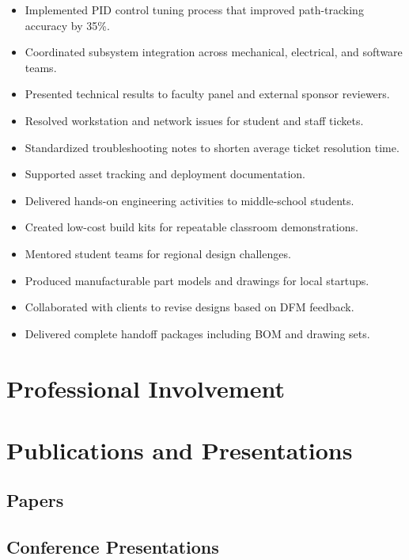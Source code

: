 \documentclass{engresume}
\begin{document}
\begin{itemize}
    \item Implemented PID control tuning process that improved path-tracking accuracy by 35\%.
    \item Coordinated subsystem integration across mechanical, electrical, and software teams.
    \item Presented technical results to faculty panel and external sponsor reviewers.
\end{itemize}

\begin{itemize}
    \item Resolved workstation and network issues for student and staff tickets.
    \item Standardized troubleshooting notes to shorten average ticket resolution time.
    \item Supported asset tracking and deployment documentation.
\end{itemize}

\begin{itemize}
    \item Delivered hands-on engineering activities to middle-school students.
    \item Created low-cost build kits for repeatable classroom demonstrations.
    \item Mentored student teams for regional design challenges.
\end{itemize}

\begin{itemize}
    \item Produced manufacturable part models and drawings for local startups.
    \item Collaborated with clients to revise designs based on DFM feedback.
    \item Delivered complete handoff packages including BOM and drawing sets.
\end{itemize}

\section{Professional Involvement}

\section{Publications and Presentations}
\subsection{Papers}
\subsection{Conference Presentations}
\end{document}
